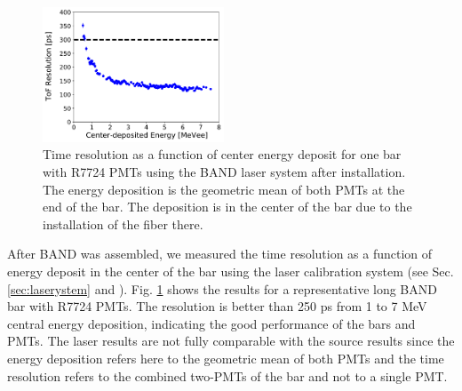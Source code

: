 \documentclass[3p,final,twocolumn]{elsarticle}
\begin{document}
\begin{figure}[tb]
	\centering
		\includegraphics[width=0.48\textwidth]{resolution-laser-scan.pdf}
		\caption{Time resolution as a function of center energy deposit for one bar with R7724 PMTs using the
                  BAND laser system after installation. The energy deposition is the geometric mean of both PMTs at the
                  end of the bar. The deposition is in the center of the bar due to the installation of the fiber there. }
         \label{fig:resolution-laser}
\end{figure}

After BAND was assembled, we measured the time resolution as a function
of energy deposit in the center of the bar using the laser calibration
system (see Sec. \ref{sec:laserystem} and \cite{band-laser}).
Fig. \ref{fig:resolution-laser} shows the results for a representative
long BAND bar with R7724 PMTs.  The resolution is better than 250
\si{\pico\s} from 1 to 7 \si{\mega\electronvolt} central energy
deposition, indicating the good performance of the bars and PMTs. The
laser results are not fully comparable with the source results since
the energy deposition refers here to the geometric mean of both PMTs
and the time resolution refers to the combined two-PMTs of the bar and
not to a single PMT.

\end{document}
